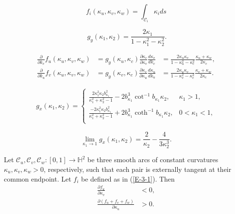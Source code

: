 \documentclass[10pt,a4paper]{amsart}
\begin{document}
\begin{equation}\label{E-3-1}f_i(\kappa_u,\kappa_v,\kappa_w)=\int_{\mathcal C_i}\kappa_ids\end{equation}

\begin{equation}\label{E-2-9}\
g_y(\kappa_1,\kappa_2)=\frac{2\kappa_1}{1-\kappa_1^2-\kappa_2^2}.
\end{equation}

\begin{equation}\label{E-2-10}\begin{aligned}
\frac{\partial}{\partial k_v}f_u(\kappa_u,\kappa_v,\kappa_w)&=g_y(\kappa_u,\kappa_c)\frac{\partial \kappa_c}{\partial \kappa_v}\frac{d\kappa_v}{dk_v}&=\frac{2\kappa_u\kappa_v}{1-\kappa_u^2-\kappa_c^2}\frac{\kappa_u+\kappa_w}{2\kappa_c},\\
\frac{\partial}{\partial k_u}f_v(\kappa_u,\kappa_v,\kappa_w)&=g_y(\kappa_v,\kappa_c)\frac{\partial \kappa_c}{\partial \kappa_u}\frac{d\kappa_u}{dk_u}&=\frac{2\kappa_u\kappa_v}{1-\kappa_v^2-\kappa_c^2}\frac{\kappa_v+\kappa_w}{2\kappa_c}.
\end{aligned}\end{equation}

\begin{equation}\label{E-6-1}\begin{aligned}
g_x(\kappa_1,\kappa_2)=\begin{cases}
\frac{2\kappa_1^2\kappa_2b^2_{\kappa_1}}{\kappa_1^2+\kappa_2^2-1}-2b_{\kappa_1}^3\cot^{-1}b_{\kappa_1}\kappa_2, & \kappa_1>1,\\[1em]
\frac{-2\kappa_1^2\kappa_2b^2_{\kappa_1}}{\kappa_1^2+\kappa_2^2-1}+2b_{\kappa_1}^3\coth^{-1}b_{\kappa_1}\kappa_2, & 0<\kappa_1<1,\\
\end{cases}
\end{aligned}\end{equation}

\begin{equation}\label{E-6-3}\lim_{\kappa_1\to 1}g_x(\kappa_1,\kappa_2)=\frac{2}{\kappa_2}-\frac{4}{3\kappa^3_2}.\end{equation}

\begin{lemma}\label{L-3-5}
Let $\mathcal C_u,\mathcal C_v,\mathcal C_w: [0,1]\to\mathbb{H}^2$ be three smooth arcs of constant curvatures $\kappa_u, \kappa_v, \kappa_w>0$, respectively, such that each pair is externally tangent at their common endpoint.
Let $f_i$ be defined as in (\ref{E-3-1}). Then
\begin{subequations}
\begin{align}
\label{E-3-9a}\frac{\partial f_u}{\partial \kappa_v}&<0,\\
\label{E-3-9b}\frac{\partial(f_u+f_v+f_w)}{\partial \kappa_u}&>0.
 \end{align}\end{subequations}
\end{lemma}
\end{document}
